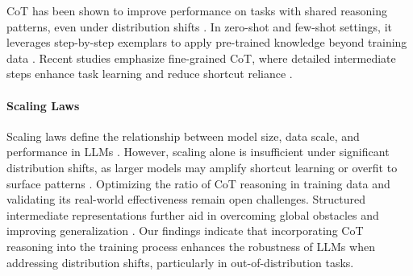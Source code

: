 CoT has been shown to improve performance on tasks with shared reasoning patterns, even under distribution shifts \cite{li2024how,hu2024unveilingstatisticalfoundationschainofthought}. In zero-shot and few-shot settings, it leverages step-by-step exemplars to apply pre-trained knowledge beyond training data \cite{kim2023cot}. Recent studies emphasize fine-grained CoT, where detailed intermediate steps enhance task learning and reduce shortcut reliance \cite{nguyen2023cof,chu-etal-2025-towards}.
\vspace{-\baselineskip}
\paragraph{Scaling Laws}
Scaling laws define the relationship between model size, data scale, and performance in LLMs \cite{kaplan2020scalinglawsneurallanguage,hoffmann2022trainingcomputeoptimallargelanguage,chowdhery2022palm}. However, scaling alone is insufficient under significant distribution shifts, as larger models may amplify shortcut learning or overfit to surface patterns \cite{micelibarone2022distributionallyrobustrecurrentdecoders}.
Optimizing the ratio of CoT reasoning in training data and validating its real-world effectiveness remain open challenges. Structured intermediate representations further aid in overcoming global obstacles and improving generalization \cite{abbe2024fartransformersreasonglobality}. Our findings indicate that incorporating CoT reasoning into the training process enhances the robustness of LLMs when addressing distribution shifts, particularly in out-of-distribution tasks.